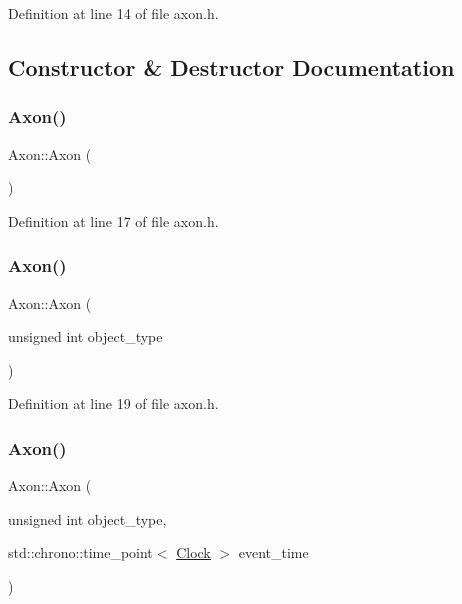 Definition at line 14 of file axon.\+h.



\subsection{Constructor \& Destructor Documentation}
\mbox{\label{class_axon_a1a0703b026b74c83e418613d929c5d22}} 
\subsubsection{\texorpdfstring{Axon()}{Axon()}\hspace{0.1cm}{\footnotesize\ttfamily [1/4]}}
{\footnotesize\ttfamily Axon\+::\+Axon (\begin{DoxyParamCaption}{ }\end{DoxyParamCaption})\hspace{0.3cm}{\ttfamily [inline]}}



Definition at line 17 of file axon.\+h.

\mbox{\label{class_axon_a7cc05238af77735983111d1ca58c9c9b}} 
\subsubsection{\texorpdfstring{Axon()}{Axon()}\hspace{0.1cm}{\footnotesize\ttfamily [2/4]}}
{\footnotesize\ttfamily Axon\+::\+Axon (\begin{DoxyParamCaption}\item[{unsigned int}]{object\+\_\+type }\end{DoxyParamCaption})\hspace{0.3cm}{\ttfamily [inline]}}



Definition at line 19 of file axon.\+h.

\mbox{\label{class_axon_a0ca4cd87ad4a2719c6b7c8c3d46dcbc6}} 
\subsubsection{\texorpdfstring{Axon()}{Axon()}\hspace{0.1cm}{\footnotesize\ttfamily [3/4]}}
{\footnotesize\ttfamily Axon\+::\+Axon (\begin{DoxyParamCaption}\item[{unsigned int}]{object\+\_\+type,  }\item[{std\+::chrono\+::time\+\_\+point$<$ \hyperlink{universe_8h_a0ef8d951d1ca5ab3cfaf7ab4c7a6fd80}{Clock} $>$}]{event\+\_\+time }\end{DoxyParamCaption})\hspace{0.3cm}{\ttfamily [inline]}}



